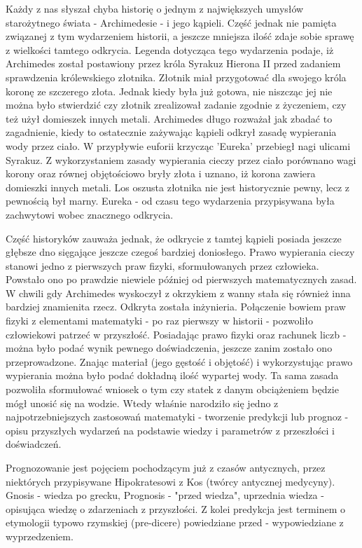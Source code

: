 \documentclass[10pt,a4paper]{book}
\begin{document}
Każdy z nas słyszał chyba historię o jednym z największych umysłów starożytnego świata - Archimedesie - i jego kąpieli. Część jednak nie pamięta związanej z tym wydarzeniem historii, a jeszcze mniejsza ilość zdaje sobie sprawę z wielkości tamtego odkrycia. Legenda dotycząca tego wydarzenia podaje, iż Archimedes został postawiony przez króla Syrakuz Hierona II przed zadaniem sprawdzenia królewskiego złotnika. Złotnik miał przygotować dla swojego króla koronę ze szczerego złota. Jednak kiedy była już gotowa, nie niszcząc jej nie można było stwierdzić czy złotnik zrealizował zadanie zgodnie z życzeniem, czy też użył domieszek innych metali. Archimedes długo rozważał jak zbadać to zagadnienie, kiedy to ostatecznie zażywając kąpieli odkrył zasadę wypierania wody przez ciało. W przypływie euforii krzycząc 'Eureka' przebiegł nagi ulicami Syrakuz. Z wykorzystaniem zasady wypierania cieczy przez ciało porównano wagi korony oraz równej objętościowo bryły złota i uznano, iż korona zawiera domieszki innych metali. Los oszusta złotnika nie jest historycznie pewny, lecz z pewnością był marny. Eureka - od czasu tego wydarzenia przypisywana była zachwytowi wobec znacznego odkrycia. 

Część historyków\citep{netz2007kodeks} zauważa jednak, że odkrycie z tamtej kąpieli posiada jeszcze głębsze dno sięgające jeszcze czegoś bardziej doniosłego. Prawo wypierania cieczy stanowi jedno z pierwszych praw fizyki, sformułowanych przez człowieka. Powstało ono po prawdzie niewiele później od pierwszych matematycznych zasad. W chwili gdy Archimedes wyskoczył z okrzykiem z wanny stała się również inna bardziej znamienita rzecz. Odkryta została inżynieria. Połączenie bowiem praw fizyki z elementami matematyki - po raz pierwszy w historii - pozwoliło człowiekowi patrzeć w przyszłość. Posiadając prawo fizyki oraz rachunek liczb - można było podać wynik pewnego doświadczenia, jeszcze zanim zostało ono przeprowadzone. Znając materiał (jego gęstość i objętość) i wykorzystując prawo wypierania można było podać dokładną ilość wypartej wody. Ta sama zasada pozwoliła sformułować wniosek o tym czy statek z danym obciążeniem będzie mógł unosić się na wodzie. Wtedy właśnie narodziło się jedno z najpotrzebniejszych zastosowań matematyki - tworzenie predykcji lub prognoz - opisu przyszłych wydarzeń na podstawie wiedzy i parametrów z przeszłości i doświadczeń.  

Prognozowanie jest pojęciem pochodzącym już z czasów antycznych, przez niektórych przypisywane Hipokratesowi z Kos (twórcy antycznej medycyny). Gnosis - wiedza po grecku, Prognosis - "przed wiedza", uprzednia wiedza - opisująca wiedzę o zdarzeniach z przyszłości. Z kolei predykcja jest terminem o etymologii typowo rzymskiej (pre-dicere) powiedziane przed - wypowiedziane z wyprzedzeniem.
\end{document}
